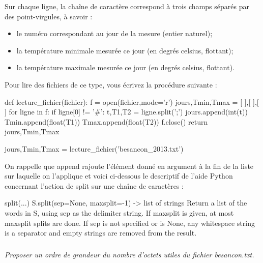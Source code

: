 \documentclass[10pt]{article}
\newif\ifprof
\begin{document}
Sur chaque ligne, la chaîne de caractère correspond à trois champs séparés par des point-virgules, à savoir :
\begin{itemize}
\item le numéro correspondant au jour de la mesure (entier naturel);
\item la température minimale mesurée ce jour (en degrés celsius, flottant);
\item la température maximale mesurée ce jour (en degrés celsius, flottant).
\end{itemize}
Pour lire des fichiers de ce type, vous écrivez la procédure suivante :

\begin{py}
\begin{python}
def lecture_fichier(fichier):
    f = open(fichier,mode='r')
    jours,Tmin,Tmax = [ ],[ ],[ ]
    for ligne in f:
        if ligne[0] != '#':
            t,T1,T2 = ligne.split(';')
            jours.append(int(t))
            Tmin.append(float(T1))
            Tmax.append(float(T2))
    f.close()
    return jours,Tmin,Tmax

jours,Tmin,Tmax = lecture_fichier('besancon_2013.txt')
\end{python}
\end{py}

On rappelle que \textsf{append} rajoute l’élément donné en argument à la fin de la liste sur laquelle on l’applique
et voici ci-dessous le descriptif de l’aide Python concernant l’action de \textsf{split} sur une chaîne de caractères :


\begin{py}
\begin{python}
split(...)
    S.split(sep=None, maxsplit=-1) -> list of strings
    Return a list of the words in S, using sep as the delimiter string. 
    If maxsplit is given, at most maxsplit splits are done. 
    If sep is not specified or is None, any whitespace string is a 
    separator and empty strings are removed from the result.
\end{python}
\end{py}

\subparagraph{}
\textit{Proposer un ordre de grandeur du nombre d’octets utiles du fichier \textsf{besancon.txt}.}
\ifprof
\begin{corrige}
Un caractère est codé par un octet en ASCII. En comptant 3 caractères pour le numéro du jour, 4 caractères pour la température minimale et 4 caractères pour la température maximale, les 2 points virgules et le retour chariot, il faut donc 14 octets pour coder une ligne et 5110 octets pour stocker les mesures sur une année. 

On peut ajouter les 17 octets d'en-tête.

\end{corrige}
\else
\fi
\end{document}
